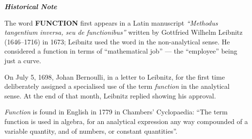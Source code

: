 \documentclass[11pt]{article}
\begin{document}
\begin{mdframed}[
  backgroundcolor=cyan!15,
  linecolor=cyan!40,
  linewidth=0pt,
  leftmargin=0pt,
  rightmargin=0pt,
  innerleftmargin=14pt,
  innerrightmargin=14pt,
  innertopmargin=12pt,
  innerbottommargin=12pt,
  skipabove=10pt,
  skipbelow=10pt,
  split=true
]

\begin{center}
\textcolor{cyan!60!black}{\textbf{\textit{Historical Note}}}
\end{center}

The word \textbf{FUNCTION} first appears in a Latin manuscript
\textit{``Methodus tangentium inversa, seu de functionibus''}
written by Gottfried Wilhelm Leibnitz (1646--1716) in 1673; Leibnitz
used the word in the non-analytical sense. He considered a function in
terms of ``mathematical job'' --- the ``employee'' being just a curve.

\medskip

On July 5, 1698, Johan Bernoulli, in a letter to Leibnitz, for the first
time deliberately assigned a specialised use of the term
\textit{function} in the analytical sense. At the end of that month,
Leibnitz replied showing his approval.

\medskip

\textit{Function} is found in English in 1779 in Chambers' Cyclopaedia:
``The term function is used in algebra, for an analytical expression any
way compounded of a variable quantity, and of numbers, or constant
quantities''.

\end{mdframed}

\begin{center}
\end{center}
\end{document}
